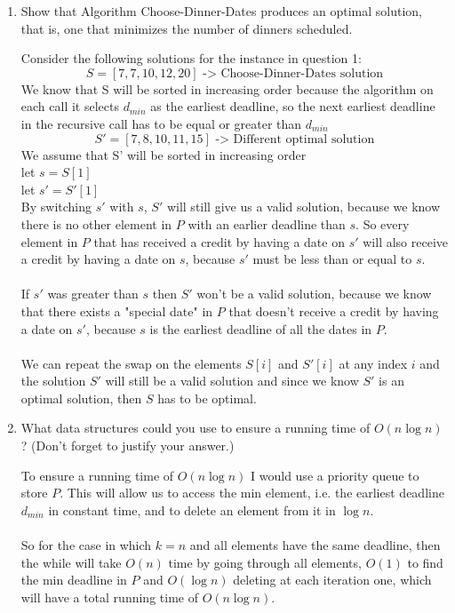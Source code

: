 \documentclass[11pt]{article}
\def\question#1{\red{#1}}
\def\soln#1{\par\blu{#1}} %
\def\blu#1{{\color{blu}#1}}
\def\red#1{{\color{red}#1}}
\begin{document}
\begin{enumerate}
\item \question{Show that Algorithm Choose-Dinner-Dates produces an optimal solution, that is, one that minimizes the number of dinners scheduled.}
\soln{
   Consider the following solutions for the instance in question 1:
   \[ S = [7, 7, 10, 12, 20] \text{ -> Choose-Dinner-Dates solution}\]
   We know that S will be sorted in increasing order because the algorithm on each call it selects $d_{min}$ as the earliest 
   deadline, so the next earliest deadline in the recursive call has to be equal or greater than $d_{min}$ \\
   \[ S' = [7, 8, 10, 11, 15] \text{ -> Different optimal solution} \]
   We assume that S' will be sorted in increasing order \\ 
   let $s = S[1]$ \\
   let $s' = S'[1]$ \\
   By switching $s'$ with $s$, $S'$ will still give us a valid solution, because we know there is no other element in 
   $P$ with an earlier deadline than $s$. So every element in $P$ that has received a credit by having a date on $s'$ 
   will also receive a credit by having a date on $s$, because $s'$ must be less than or equal to $s$. \\ \\ 
   If $s'$ was greater than $s$ then $S'$ won't be a valid solution, because we know that there exists a 
   "special date" in $P$ that doesn't receive a credit by having a date on $s'$, because $s$ is the earliest deadline 
   of all the dates in $P$.\\ \\
   We can repeat the swap on the elements $S[i]$ and $S'[i]$ at any index $i$ and the solution $S'$ will still 
   be a valid solution and since we know $S'$ is an optimal solution, then $S$ has to be optimal.
}

\item \question{What data structures could you use to ensure a running time of $O(n \log n)$? (Don't forget to justify your answer.)}
\soln{
   To ensure a running time of $O(n \log n)$ I would use a priority queue to store $P$. This will allow us to access 
   the min element, i.e. the earliest deadline $d_{min}$ in constant time, and to delete an element from it in 
   $\log n$. \\ \\
   So for the case in which $k=n$ and all elements have the same deadline, then the while will take $O(n)$ time 
   by going through all elements, $O(1)$ to find the min deadline in $P$ and $O(\log n)$ deleting at each iteration one,
   which will have a total running time of $O(n \log n)$. 
}


\end{enumerate}
\end{document}
